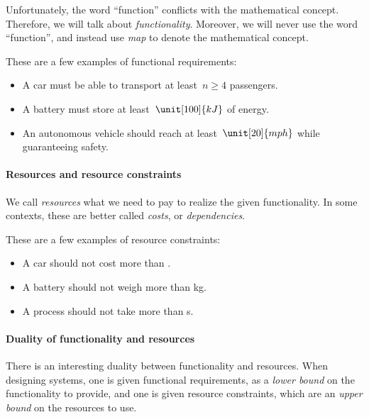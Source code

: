 Unfortunately, the word ``function'' conflicts with the mathematical concept. Therefore, we will talk about \emph{functionality}. Moreover, we will never use the word ``function'', and instead use \emph{map} to denote the mathematical concept.

\begin{example}
    These are a few examples of functional requirements:
    \begin{itemize}
        \item A car must be able to transport at least~$n \geq 4$ passengers.
        \item A battery must store at least~$\unit[100]{kJ}$ of energy.
        \item An autonomous vehicle should reach at least~$\unit[20]{mph}$ while guaranteeing safety.
    \end{itemize}
\end{example}

\paragraph{Resources and resource constraints}

We call \emph{resources} what we need to pay to realize the given functionality.
In some contexts, these are better called \emph{costs}, or \emph{dependencies}.


\begin{example}
    These are a few examples of resource constraints:
    \begin{itemize}
        \item A car should not cost more than \unit[15,000]{\USD}.
        \item A battery should not weigh more than \unit[1]{kg}.
        \item A process should not take more than \unit[10]{s}.
    \end{itemize}
\end{example}

\paragraph{Duality of functionality and resources}

There is an interesting duality between functionality and resources. When designing systems, one is given functional requirements, as a \emph{lower bound} on the functionality to provide, and one is given resource constraints, which are an \emph{upper bound} on the resources to use.

